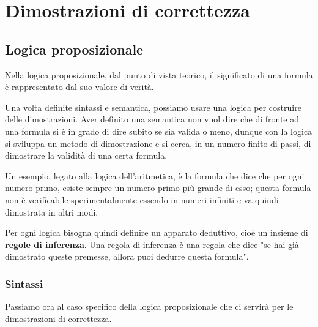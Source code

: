 \chapter{Dimostrazioni di correttezza}
\section{Logica proposizionale}
Nella logica proposizionale, dal punto di vista teorico, il significato di una
formula è rappresentato dal suo valore di verità.

Una volta definite sintassi e semantica, possiamo usare una logica per costruire
delle dimostrazioni. Aver definito una semantica non vuol dire che di fronte ad
una formula si è in grado di dire subito se sia valida o meno, dunque con la logica
si sviluppa un metodo di dimostrazione e si cerca, in un numero finito di passi,
di dimostrare la validità di una certa formula.

Un esempio, legato alla logica dell'aritmetica, è la formula che dice che per ogni
numero primo, esiste sempre un numero primo più grande di esso; questa formula
non è verificabile sperimentalmente essendo in numeri infiniti e va quindi
dimostrata in altri modi.

Per ogni logica bisogna quindi definire un apparato deduttivo, cioè un insieme di
\textbf{regole di inferenza}. Una regola di inferenza è una regola che dice "se
hai già dimostrato queste premesse, allora puoi dedurre questa formula".
\subsection{Sintassi}
Passiamo ora al caso specifico della logica proposizionale che ci servirà per le
dimostrazioni di correttezza.


